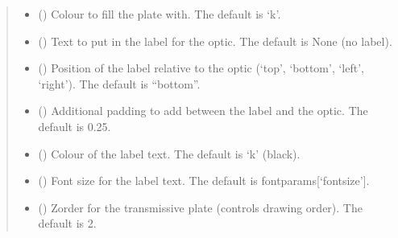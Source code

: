 \documentclass[letterpaper,10pt,english]{sphinxmanual}
\begin{document}
\begin{fulllineitems}
\begin{fulllineitems}
\begin{quote}
\begin{description}
\begin{itemize}
\item {} 
\sphinxAtStartPar
{} (\sphinxstyleliteralemphasis{\sphinxupquote{, }}) \textendash{} Colour to fill the plate with. The default is ‘k’.

\item {} 
\sphinxAtStartPar
{} (\sphinxstyleliteralemphasis{\sphinxupquote{, }}) \textendash{} Text to put in the label for the optic. The default is None (no label).

\item {} 
\sphinxAtStartPar
{} (\sphinxstyleliteralemphasis{\sphinxupquote{, }}) \textendash{} Position of the label relative to the optic (‘top’, ‘bottom’, ‘left’, ‘right’).
The default is “bottom”.

\item {} 
\sphinxAtStartPar
{} (\sphinxstyleliteralemphasis{\sphinxupquote{, }}) \textendash{} Additional padding to add between the label and the optic. The default is 0.25.

\item {} 
\sphinxAtStartPar
{} (\sphinxstyleliteralemphasis{\sphinxupquote{, }}) \textendash{} Colour of the label text. The default is ‘k’ (black).

\item {} 
\sphinxAtStartPar
{} (\sphinxstyleliteralemphasis{\sphinxupquote{, }}) \textendash{} Font size for the label text. The default is fontparams{[}‘fontsize’{]}.

\item {} 
\sphinxAtStartPar
{} (\sphinxstyleliteralemphasis{\sphinxupquote{, }}) \textendash{} Zorder for the transmissive plate (controls drawing order). The default is 2.


\end{itemize}
\end{description}
\end{quote}
\end{fulllineitems}
\end{fulllineitems}
\end{document}

